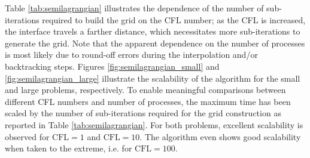 Table \ref{tab:semilagrangian} illustrates the dependence of the number of sub-iterations required to build the grid on the CFL number; as the CFL is increased, the interface travels a farther distance, which necessitates more sub-iterations to generate the grid. Note that the apparent dependence on the number of processes is most likely due to round-off errors during the interpolation and/or backtracking steps. Figures \ref{fig:semilagrangian_small} and \ref{fig:semilagrangian_large} illustrate the scalability of the algorithm for the small and large problems, respectively. To enable meaningful comparisons between different CFL numbers and number of processes, the maximum time has been scaled by the number of sub-iterations required for the grid construction as reported in Table \ref{tab:semilagrangian}. For both problems, excellent scalability is observed for $\text{CFL} = 1$ and $\text{CFL} = 10$. The algorithm even shows good scalability when taken to the extreme, i.e. for $\text{CFL} = 100$.

